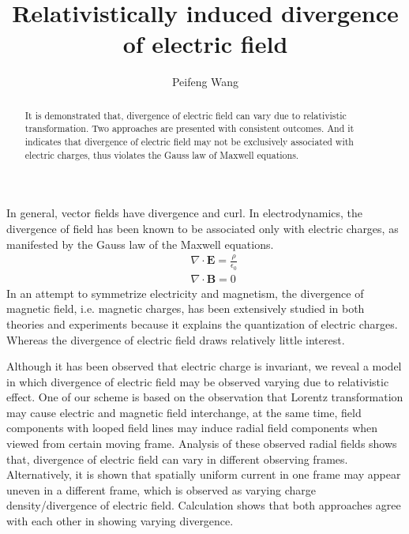 \documentclass[prd,showpacs,twocolumn]{revtex4-1}
\begin{document}
\title{Relativistically induced divergence of electric field}
\author{Peifeng Wang}
\address{Mijiaqiao 34-1-5, Xi'an, Shaanxi, P. R. China 710075}
\address{Guanghua Road 1\#, 34-1-5 3rd floor, Yanta District, Xi'an, Shaanxi, P. R. China 710075}
\begin{abstract}
It is demonstrated that, divergence of electric field can vary due to relativistic transformation. Two approaches are presented with consistent outcomes. And it indicates that divergence of electric field may not be exclusively associated with electric charges, thus violates the Gauss law of Maxwell equations.
\end{abstract}
\maketitle

In general, vector fields have divergence and curl. In electrodynamics, the divergence of field has been known to be associated only with electric charges, as manifested by the Gauss law of the Maxwell equations.
\begin{eqnarray}
&&\nabla\cdot\mathbf{E}=\frac{\rho}{\epsilon_0}\nonumber\\
&&\nabla\cdot\mathbf{B}=0
\label{eqn:GaussLaw}
\end{eqnarray}
In an attempt to symmetrize electricity and magnetism, the divergence of magnetic field, i.e. magnetic charges\cite{Dirac,Schwinger}, has been extensively studied in both theories\cite{Hooft, Polyakov,Ginzburg,Rujula} and experiments\cite{Cabrera,Caplin,Pinfold,L3,D0,Fang} because it explains the quantization of electric charges. Whereas the divergence of electric field draws relatively little interest.

Although it has been observed that electric charge is invariant\cite{King}, we reveal a model in which divergence of electric field may be observed varying due to relativistic effect. One of our scheme is based on the observation that Lorentz transformation may cause electric and magnetic field interchange, at the same time, field components with looped field lines may induce radial field components when viewed from certain moving frame. Analysis of these observed radial fields shows that, divergence of electric field can vary in different observing frames. Alternatively, it is shown that spatially uniform current in one frame may appear uneven in a different frame, which is observed as varying charge density/divergence of electric field. Calculation shows that both approaches agree with each other in showing varying divergence.
\end{document}
